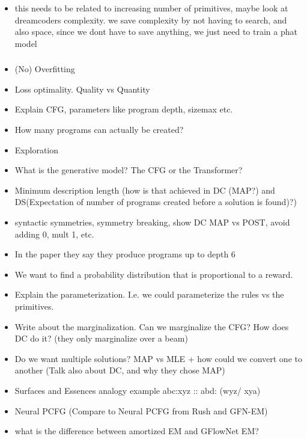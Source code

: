 \begin{itemize}
    \item this needs to be related to increasing number of primitives, maybe look at dreamcoders complexity. we save complexity by not having to search, and also space, since we dont have to save anything, we just need to train a phat model
\end{itemize}

\subsubsection{}


\begin{itemize}
    \item (No) Overfitting 
    \item Loss optimality. Quality vs Quantity
    \item Explain CFG, parameters like program depth, sizemax etc. 
    \item How many programs can actually be created?
    \item Exploration
    \item What is the generative model? The CFG or the Transformer?
    \item Minimum description length (how is that achieved in DC (MAP?) and DS(Expectation of number of programs created before a solution is found)?)
    \item syntactic symmetries, symmetry breaking, show DC MAP vs POST, avoid adding 0, mult 1, etc. 
    \item In the paper they say they produce programs up to depth 6
    \item We want to find a probability distribution that is proportional to a reward.
    \item Explain the parameterization. I.e. we could parameterize the rules vs the primitives. 
    \item Write about the marginalization. Can we marginalize the CFG? How does DC do it? (they only marginalize over a beam) 
    \item Do we want multiple solutions? MAP vs MLE + how could we convert one to another (Talk also about DC, and why they chose MAP)
    \item Surfaces and Essences analogy example abc:xyz :: abd: (wyz/ xya) 
    \item Neural PCFG (Compare to Neural PCFG from Rush and GFN-EM)
    \item what is the difference between amortized EM and GFlowNet EM?

\end{itemize}
